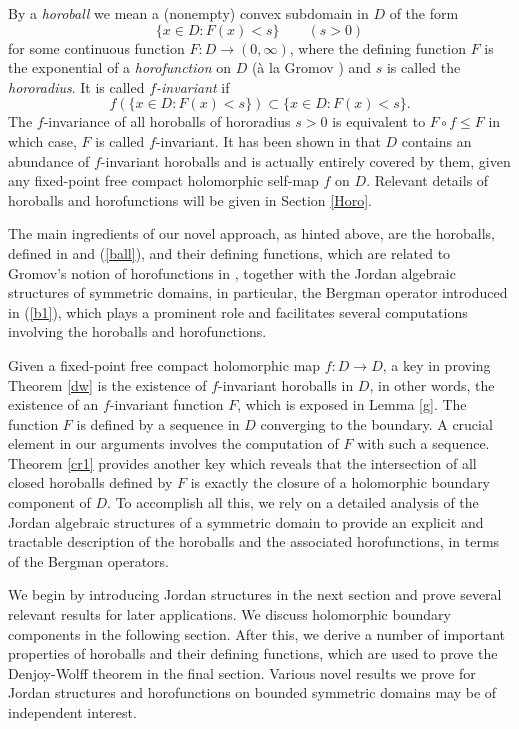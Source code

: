 \documentclass[12pt, twoside]{article}
\theoremstyle{definition}
\numberwithin{equation}{section}
\begin{document}
By a {\it horoball} we mean a (nonempty) convex subdomain in $D$ of the form
$$\{x\in D: F(x) <s\} \qquad (s>0)$$
for some continuous function $F: D \longrightarrow (0,\infty)$, where the defining function $F$  is the exponential of a {\it horofunction}
on $D$ (\`a la Gromov \cite{grom}) and $s$ is called the {\it hororadius}. It is called {\it $f$-invariant} if
$$f(\{x\in D: F(x) <s\}) \subset \{x\in D: F(x) <s\}.$$
The $f$-invariance of all horoballs of hororadius $s> 0$ is equivalent to $F\circ f \leq F$
in which case, $F$ is called $f$-invariant.
It has been shown
in \cite[Theorem 4.4]{horo} that  $D$ contains an abundance of $f$-invariant horoballs
and is actually entirely covered by them, given any
 fixed-point free compact holomorphic self-map $f$ on $D$. Relevant details of horoballs
and horofunctions will be given in Section \ref{Horo}.


The main ingredients of our novel approach, as hinted above,  are the horoballs,  defined in \cite{horo} and (\ref{ball}),
 and their defining functions, which are related to Gromov's notion of horofunctions in \cite{ball,grom},
together with the Jordan algebraic structures of  symmetric domains, in particular,
the Bergman operator introduced in (\ref{b1}), which plays a prominent role
 and facilitates several computations involving the horoballs and horofunctions.


Given a  fixed-point free compact holomorphic map
$f: D \longrightarrow D$, a key in proving Theorem \ref{dw} is the existence of
$f$-invariant horoballs in $D$,  in other words, the existence of an $f$-invariant function $F$,
which  is exposed in Lemma \ref{g}. The function $F$
 is defined by a sequence in $D$ converging to the
boundary. A crucial element in our arguments involves the computation of $F$ with such a sequence.
  Theorem \ref{cr1} provides another key
 which reveals that the intersection of all  closed horoballs defined by $F$
is exactly the closure of a holomorphic boundary component of $D$. To accomplish all this, we rely on
a detailed analysis of the
Jordan algebraic structures of a symmetric domain to provide an explicit and tractable description of the horoballs and the
 associated horofunctions, in terms of the Bergman operators.

We begin by introducing Jordan structures in the next section and prove several relevant results
for later applications. We discuss holomorphic boundary components in the following section.
After this, we derive a number of important properties of  horoballs and their defining functions, which
 are used to prove the Denjoy-Wolff  theorem in the final section.
 Various novel results we prove for Jordan structures and horofunctions on bounded symmetric domains
 may be of  independent interest.
\end{document}
